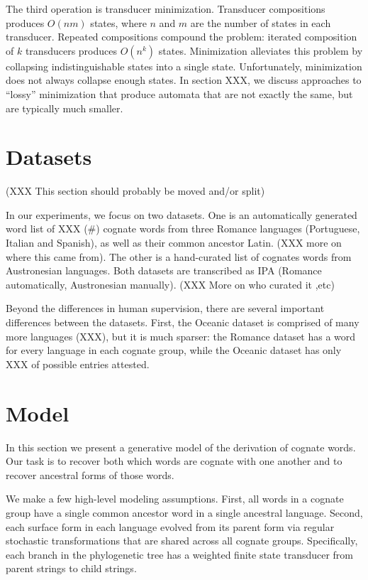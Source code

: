 \documentclass[11pt,a4paper]{article}
\begin{document}
The third operation is transducer minimization. Transducer compositions
produces $O(nm)$ states, where $n$ and $m$ are the number of states
in each transducer. Repeated compositions compound the problem:
iterated composition of $k$ transducers produces $O(n^k)$ states.
Minimization alleviates this problem by collapsing indistinguishable
states into a single state. Unfortunately, minimization does not
always collapse enough states. In section XXX, we discuss approaches
to ``lossy'' minimization that produce automata that are not exactly
the same, but are typically much smaller.

\section{Datasets}

(XXX This section should probably be moved and/or split)

In our experiments, we focus on two datasets. One is an automatically
generated word list of XXX (\#) cognate words from three Romance
languages (Portuguese, Italian and Spanish), as well as their common
ancestor Latin. (XXX more on where this came from). The other is a
hand-curated list of cognates words from Austronesian languages.
Both datasets are transcribed as IPA (Romance automatically,
Austronesian manually). (XXX More on who curated it ,etc)

Beyond the differences in human supervision, there are several
important differences between the datasets. First, the Oceanic
dataset is comprised of many more languages (XXX), but it is much
sparser: the Romance dataset has a word for every language in each
cognate group, while the Oceanic dataset has only XXX of possible
entries attested.

\section{Model}

In this section we present a generative model of the derivation of
cognate words. Our task is to recover both which words are cognate
with one another and to recover ancestral forms of those words.

We make a few high-level modeling assumptions. First, all words in
a cognate group have a single common ancestor word in a single
ancestral language. Second, each surface form in each language
evolved from its parent form via regular stochastic transformations
that are shared across all cognate groups. Specifically, each branch
in the phylogenetic tree has a weighted finite state transducer
from parent strings to child strings.
\end{document}
